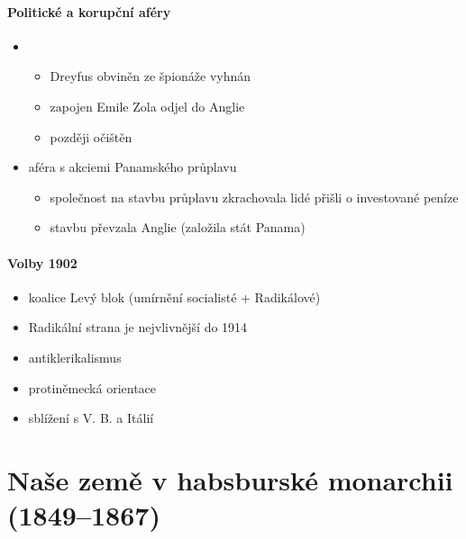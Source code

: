\paragraph{Politické a korupční aféry}
\begin{itemize}
\item {}
	\begin{itemize}
	\item Dreyfus obviněn ze špionáže \ra vyhnán 
	\item zapojen Emile Zola \ra odjel do Anglie
	\item později očištěn
	\end{itemize}
\item aféra s akciemi Panamského průplavu
	\begin{itemize}
	\item společnost na stavbu průplavu zkrachovala \ra lidé přišli o investované peníze
	\item stavbu převzala Anglie (založila stát Panama)
	\end{itemize}
\end{itemize}

\paragraph{Volby 1902}
\begin{itemize}
\item koalice Levý blok (umírnění socialisté + Radikálové)
\item Radikální strana je nejvlivnější do 1914
\item antiklerikalismus
\item protiněmecká orientace
\item sblížení s V. B. a Itálií
\end{itemize}






\section{Naše země v habsburské monarchii (1849--1867)}
